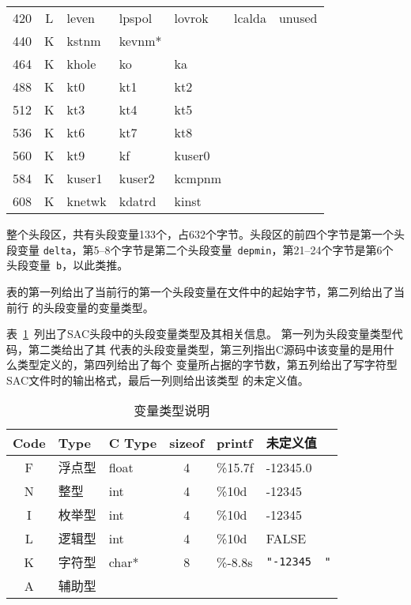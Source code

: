 \begin{table}[H]
\begin{tabular}{c|c|lllll}
	420		&	L	&	leven	&	lpspol	&	lovrok	&	lcalda	&	unused	\\
	440		&	K	&	kstnm	&	kevnm*	&			&			&			\\
	464		&	K	&	khole	&	ko		&	ka		&			&			\\
	488		&	K	&	kt0		&	kt1		&	kt2		&			&			\\
	512		&	K	&	kt3		&	kt4		&	kt5		&			&			\\
	536		&	K	&	kt6		&	kt7		&	kt8		&			&			\\
	560		&	K	&	kt9		&	kf		&	kuser0	&			&			\\
	584		&	K	&	kuser1	&	kuser2	&	kcmpnm	&			&			\\
	608		&	K	&	knetwk	&	kdatrd	&	kinst	&			&			\\
    \bottomrule
\end{tabular}
\end{table}

整个头段区，共有头段变量133个，占632个字节。头段区的前四个字节是第一个头段变量
\verb+delta+，第5--8个字节是第二个头段变量~\verb+depmin+，第21--24个字节是第6个
头段变量~\verb+b+，以此类推。

表的第一列给出了当前行的第一个头段变量在文件中的起始字节，第二列给出了当前行
的头段变量的变量类型。

表~\ref{table:header-variables-type}~列出了SAC头段中的头段变量类型及其相关信息。
第一列为头段变量类型代码，第二类给出了其
代表的头段变量类型，第三列指出C源码中该变量的是用什么类型定义的，第四列给出了每个
变量所占据的字节数，第五列给出了写字符型SAC文件时的输出格式，最后一列则给出该类型
的未定义值。

\begin{table}[H]
\caption{变量类型说明}
\label{table:header-variables-type}
\centering
\ttfamily
\small
\begin{tabular}{cllcll}
	\toprule
    Code    &	Type        &   C Type & sizeof &   printf	&   未定义值        \\
	\midrule
    F		&	浮点型		&   float  &  4     &	\%15.7f &   -12345.0        \\
    N		&	整型		&   int    &  4     &	\%10d   &   -12345        \\
    I		&	枚举型		&   int    &  4     &	\%10d   &   -12345	        \\
    L		&	逻辑型		&   int    &  4     &	\%10d   &   FALSE        \\
    K		&	字符型		&   char*  &  8     &	\%-8.8s & \lstinline[showspaces=true]!"-12345  "!     \\
    A		&	辅助型		&          &        &			& 	    \\
	\bottomrule
\end{tabular}
\end{table}

